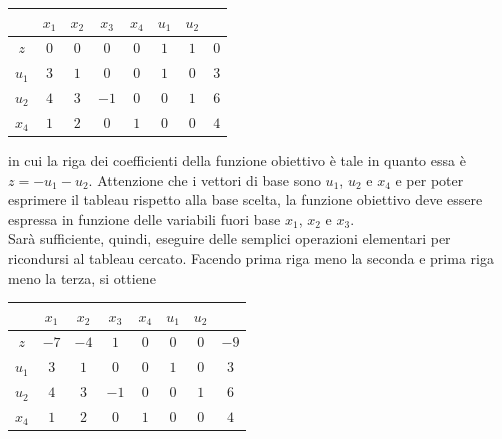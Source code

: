 \documentclass[a4paper]{extarticle}
\renewcommand\arraystretch{}
\begin{document}
\vspace{1em}
\noindent
\begin{table}[H]
    \setlength{\tabcolsep}{4pt}
    \renewcommand{\arraystretch}{1.2}
    \noindent
    \centering
    \begin{tabular}{|c|cccc|cc|c|}
        & $x_1$ & $x_2$ & $x_3$ & $x_4$ & $u_1$ & $u_2$ &\\
        \hline
        $z$ & $0$ & $0$ & $0$ & $0$ & $1$ & $1$ & $0$\\
        \hline
        $u_1$ & $3$ & $1$ & $0$ & $0$ & $1$ & $0$ & $3$\\
        $u_2$ & $4$ & $3$ & $-1$ & $0$ & $0$ & $1$ & $6$\\
        $x_4$ & $1$ & $2$ & $0$ & $1$ & $0$ & $0$  & $4$\\
        \hline
    \end{tabular}
\end{table}   

\vspace{1em}
\noindent
in cui la riga dei coefficienti della funzione obiettivo è tale in quanto essa è $z=-u_1-u_2$. Attenzione che i vettori di base sono $u_1$, $u_2$ e $x_4$ e per poter esprimere il tableau rispetto alla base scelta, la funzione obiettivo deve essere espressa in funzione delle variabili fuori base $x_1$, $x_2$ e $x_3$.\\
Sarà sufficiente, quindi, eseguire delle semplici operazioni elementari per ricondursi al tableau cercato. Facendo prima riga meno la seconda e prima riga meno la terza, si ottiene

\vspace{1em}
\noindent
\begin{table}[H]
    \setlength{\tabcolsep}{4pt}
    \renewcommand{\arraystretch}{1.2}
    \noindent
    \centering
    \begin{tabular}{|c|cccc|cc|c|}
        & $x_1$ & $x_2$ & $x_3$ & $x_4$ & $u_1$ & $u_2$ &\\
        \hline
        $z$ & $-7$ & $-4$ & $1$ & $0$ & $0$ & $0$ & $-9$\\
        \hline
        $u_1$ & $3$ & $1$ & $0$ & $0$ & $1$ & $0$ & $3$\\
        $u_2$ & $4$ & $3$ & $-1$ & $0$ & $0$ & $1$ & $6$\\
        $x_4$ & $1$ & $2$ & $0$ & $1$ & $0$ & $0$  & $4$\\
        \hline
    \end{tabular}
\end{table}
\end{document}
